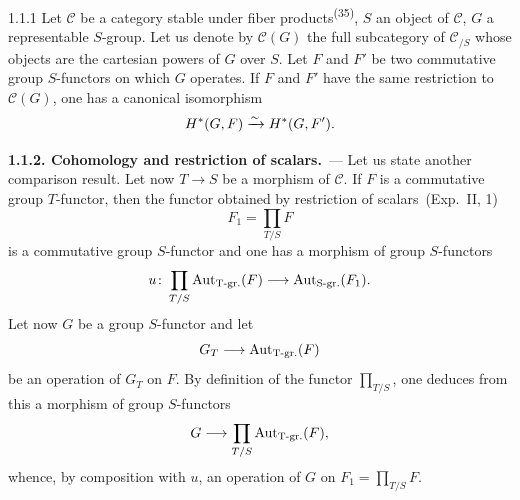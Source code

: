 \begin{lemma}{1.1.1}\label{III.1.1.1}
Let \(\mathcal{C}\) be a category stable under fiber
products\textsuperscript{(35)}, \(S\) an object of \(\mathcal{C}\), \(G\) a
representable \(S\)-group. Let us denote by \(\mathcal{C}(G)\) the full
subcategory of \(\mathcal{C}_{/S}\) whose objects are the cartesian powers
of \(G\) over \(S\). Let \(F\) and \(F'\) be two commutative group
\(S\)-functors on which \(G\) operates. If \(F\) and \(F'\) have the same
restriction to \(\mathcal{C}(G)\), one has a canonical isomorphism
\[
H^{*}(G, F)\xrightarrow{\sim} H^{*}(G, F').
\]
\end{lemma}

\par{}%
\noindent\textbf{1.1.2. Cohomology and restriction of scalars.}\ ---%
\label{III.ssec.1.1.2}
{\renewcommand{\thefootnote}{(36)}}
Let us state another comparison result. Let now \(T\to S\) be a morphism of
\(\mathcal{C}\). If \(F\) is a commutative group \(T\)-functor, then the
functor obtained by \og restriction of scalars\fg\ (\cf Exp.~II, 1)
\[
F_{1}=\prod_{T/S}F
\]
is a commutative group \(S\)-functor and one has a morphism of group
\(S\)-functors
\[
u\colon
  \prod_{T/S}\operatorname{Aut}_{\mathrm{T}\text{-gr.}}(F)
  \longrightarrow
  \operatorname{Aut}_{\mathrm{S}\text{-gr.}}(F_{1}).
\]%
{\renewcommand{\thefootnote}{(37)}}
Let now \(G\) be a group \(S\)-functor and let
\[
G_{T}\longrightarrow\operatorname{Aut}_{\mathrm{T}\text{-gr.}}(F)
\]
be an operation of \(G_{T}\) on \(F\). By definition of the functor
\(\prod_{T/S}\), one deduces from this a morphism of group \(S\)-functors
\[
G\longrightarrow\prod_{T/S}\operatorname{Aut}_{\mathrm{T}\text{-gr.}}(F),
\]
whence, by composition with \(u\), an operation of \(G\) on
\(F_{1}=\prod_{T/S}F\).%
{\renewcommand{\thefootnote}{(38)}}


